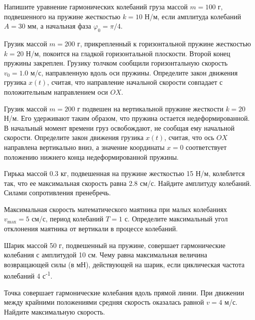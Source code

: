\begin{ex}
Напишите уравнение гармонических колебаний груза массой $m = 100$ г, подвешенного на пружине жесткостью $k = 10$ Н/м, если амплитуда колебаний $A = 30 $ мм, а начальная фаза $\varphi_0 = \pi/4$.
\end{ex}	

\begin{ex}
Грузик массой $m = 200$ г, прикрепленный к горизонтальной пружине жесткостью $k = 20 $ Н/м, покоится на гладкой горизонтальной плоскости. Второй конец пружины закреплен. Грузику толчком сообщили горизонтальную скорость $v_0 = 1.0$ м/с, направленную вдоль оси пружины. Определите закон движения грузика $x(t)$, считая, что направление начальной скорости совпадает с положительным направлением оси $OX$.
\end{ex}	

\begin{ex}
Грузик массой $m = 200$ г подвешен на вертикальной пружине жесткости $k = 20$ Н/м. Его удерживают таким образом, что пружина остается недеформированной. В начальный момент времени груз освобождают, не сообщая ему начальной скорости. Определите закон движения грузика $x(t)$, считая, что ось $OX$ направлена вертикально вниз, а значение координаты $x = 0$ соответствует положению нижнего конца недеформированной пружины.
\end{ex}	

\begin{ex}
Гирька массой 0.3 кг, подвешенная на пружине жесткостью 15 Н/м, колеблется так, что ее максимальная скорость равна 2.8 см/с. Найдите амплитуду колебаний. Силами сопротивления пренебречь.
\end{ex}	

\begin{ex}
Максимальная скорость математического маятника при малых колебаниях $v_{\max} = 5 $ см/с, период колебаний $T = 1$ с. Определите максимальный угол отклонения маятника от вертикали в процессе колебаний.
\end{ex}	

\begin{ex}
Шарик массой 50 г, подвешенный на пружине, совершает гармонические колебания с амплитудой 10 см. Чему равна максимальная величина возвращающей силы (в мН), действующей на шарик, если циклическая частота колебаний 4 с\textsuperscript{-1}.
\end{ex}	

\begin{ex}
Точка совершает гармонические колебания вдоль прямой линии. При движении между крайними положениями средняя скорость оказалась равной $v = 4$ м/с. Найдите максимальную скорость.
\end{ex}	

